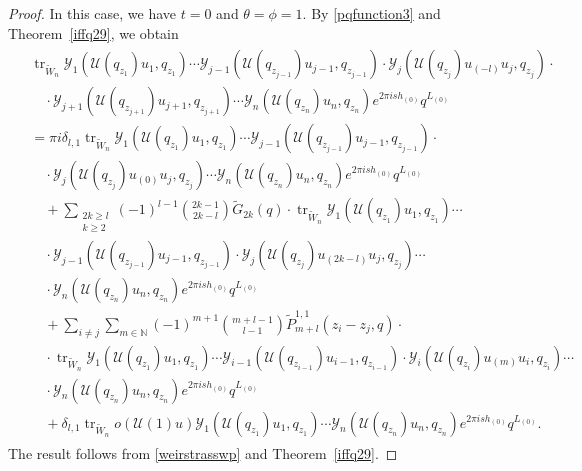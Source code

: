 \documentclass[9pt]{amsart}
\newcommand{\Y}{\mathcal{Y}}
\begin{document}
\begin{proof}
In this case, we have $t = 0$ and $\theta = \phi = 1$. By \eqref{pqfunction3} and Theorem~\ref{iffq29}, we obtain
\begin{align}\label{iffq2121}
\begin{split}
   &\operatorname{tr}_{\tilde{W}_n} \Y_1(\mathcal{U}(q_{z_1})u_1, q_{z_1}) \cdots \Y_{j-1}(\mathcal{U}(q_{z_{j-1}})u_{j-1}, q_{z_{j-1}}) \cdot \Y_j(\mathcal{U}(q_{z_j})u_{(-l)}u_j, q_{z_j}) \cdot \\
   &\quad\cdot \Y_{j+1}(\mathcal{U}(q_{z_{j+1}})u_{j+1}, q_{z_{j+1}}) \cdots \Y_n(\mathcal{U}(q_{z_n})u_n, q_{z_n}) e^{2\pi i s h_{(0)}} q^{L_{(0)}} \\
   &= \pi i \delta_{l,1} \operatorname{tr}_{\tilde{W}_n} \Y_1(\mathcal{U}(q_{z_1})u_1, q_{z_1}) \cdots \Y_{j-1}(\mathcal{U}(q_{z_{j-1}})u_{j-1}, q_{z_{j-1}}) \cdot \\
   &\quad\cdot \Y_j(\mathcal{U}(q_{z_j})u_{(0)}u_j, q_{z_j}) \cdots \Y_n(\mathcal{U}(q_{z_n})u_n, q_{z_n}) e^{2\pi i s h_{(0)}} q^{L_{(0)}} \\
   &\quad+ \sum_{\substack{2k \geq l \\ k \geq 2}} (-1)^{l-1} \binom{2k - 1}{2k - l} \tilde{G}_{2k}(q) \cdot \operatorname{tr}_{\tilde{W}_n} \Y_1(\mathcal{U}(q_{z_1})u_1, q_{z_1}) \cdots \\
   &\quad\cdot \Y_{j-1}(\mathcal{U}(q_{z_{j-1}})u_{j-1}, q_{z_{j-1}}) \cdot \Y_j(\mathcal{U}(q_{z_j})u_{(2k - l)}u_j, q_{z_j}) \cdots \\
   &\quad\cdot \Y_n(\mathcal{U}(q_{z_n})u_n, q_{z_n}) e^{2\pi i s h_{(0)}} q^{L_{(0)}} \\
   &\quad+ \sum_{i \neq j} \sum_{m \in \mathbb{N}} (-1)^{m+1} \binom{m + l - 1}{l - 1} \tilde{P}_{m+l}^{1,1}(z_i - z_j, q) \cdot \\
   &\quad\cdot \operatorname{tr}_{\tilde{W}_n} \Y_1(\mathcal{U}(q_{z_1})u_1, q_{z_1}) \cdots \Y_{i-1}(\mathcal{U}(q_{z_{i-1}})u_{i-1}, q_{z_{i-1}}) \cdot \Y_i(\mathcal{U}(q_{z_i})u_{(m)}u_i, q_{z_i}) \cdots \\
   &\quad\cdot \Y_n(\mathcal{U}(q_{z_n})u_n, q_{z_n}) e^{2\pi i s h_{(0)}} q^{L_{(0)}} \\
   &\quad+ \delta_{l,1} \operatorname{tr}_{\tilde{W}_n} o(\mathcal{U}(1)u) \Y_1(\mathcal{U}(q_{z_1})u_1, q_{z_1}) \cdots \Y_n(\mathcal{U}(q_{z_n})u_n, q_{z_n}) e^{2\pi i s h_{(0)}} q^{L_{(0)}}.
\end{split}
\end{align}
The result follows from \eqref{weirstrasswp} and Theorem~\ref{iffq29}.
\end{proof}
\end{document}
